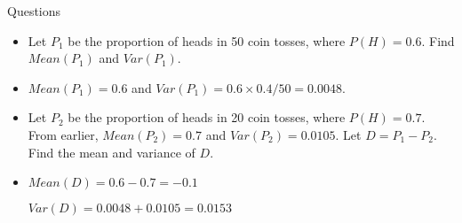 \documentclass[10pt, xcolor=table]{beamer}
\begin{document}
\begin{frame}{Questions}
\begin{itemize}
\setlength{\itemsep}{15pt}
\item<1->[Q7:] Let $P_1$ be the proportion of heads in 50 coin tosses, where $P(H) = 0.6$. Find $Mean(P_1)$ and $Var(P_1)$.
\item<2->[A7:] {\color{red} $Mean(P_1) = 0.6$ and $Var(P_1) = 0.6 \times 0.4/ 50 = 0.0048$.}
\item<3->[Q8:] Let $P_2$ be the proportion of heads in 20 coin tosses, where $P(H) = 0.7$. From earlier, $Mean(P_2) = 0.7$ and $Var(P_2) = 0.0105$. Let $D = P_1 - P_2$. Find the mean and variance of $D$.
\item<4->[A8:] {\color{red} $Mean(D) = 0.6 - 0.7 = -0.1$

$Var(D) = 0.0048 + 0.0105 = 0.0153$}
\end{itemize}
\end{frame}
\end{document}
